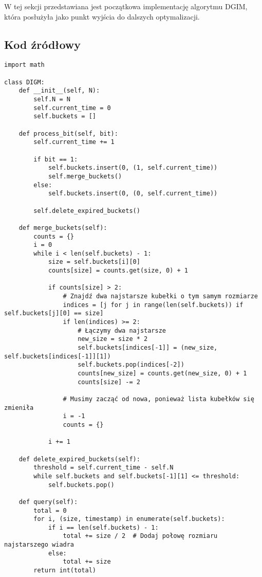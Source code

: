 \documentclass{article}
\begin{document}
W tej sekcji przedstawiana jest początkowa implementację algorytmu DGIM, która posłużyła jako punkt wyjścia do dalszych optymalizacji.

\subsection{Kod źródłowy}

\begin{lstlisting}[style=pystyle, caption=Początkowa implementacja algorytmu DGIM]
import math

class DIGM:
    def __init__(self, N):
        self.N = N
        self.current_time = 0
        self.buckets = []

    def process_bit(self, bit):
        self.current_time += 1

        if bit == 1:
            self.buckets.insert(0, (1, self.current_time))
            self.merge_buckets()
        else:
            self.buckets.insert(0, (0, self.current_time))

        self.delete_expired_buckets()

    def merge_buckets(self):
        counts = {}
        i = 0
        while i < len(self.buckets) - 1:
            size = self.buckets[i][0]
            counts[size] = counts.get(size, 0) + 1

            if counts[size] > 2:
                # Znajdź dwa najstarsze kubełki o tym samym rozmiarze
                indices = [j for j in range(len(self.buckets)) if self.buckets[j][0] == size]
                if len(indices) >= 2:
                    # Łączymy dwa najstarsze
                    new_size = size * 2
                    self.buckets[indices[-1]] = (new_size, self.buckets[indices[-1]][1])
                    self.buckets.pop(indices[-2])
                    counts[new_size] = counts.get(new_size, 0) + 1
                    counts[size] -= 2

                # Musimy zacząć od nowa, ponieważ lista kubełków się zmieniła
                i = -1
                counts = {}

            i += 1

    def delete_expired_buckets(self):
        threshold = self.current_time - self.N
        while self.buckets and self.buckets[-1][1] <= threshold:
            self.buckets.pop()

    def query(self):
        total = 0
        for i, (size, timestamp) in enumerate(self.buckets):
            if i == len(self.buckets) - 1:
                total += size / 2  # Dodaj połowę rozmiaru najstarszego wiadra
            else:
                total += size
        return int(total)
\end{lstlisting}
\end{document}
